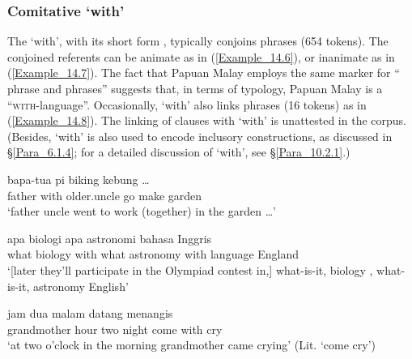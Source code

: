 \subsubsection[Comitative dengang ‘with’]{Comitative  ‘with’}
\label{Para_14.2.1.1}
The    ‘with’, with its short form , typically conjoins  phrases (654 tokens). The conjoined referents can be animate as in (\ref{Example_14.6}), or inanimate as in (\ref{Example_14.7}). The fact that Papuan Malay employs the same marker for “ phrase  and  phrases” suggests that, in terms of  typology, Papuan Malay is a  ``\textsc{with}{}-language''. Occasionally,  ‘with’ also links  phrases (16 tokens) as in (\ref{Example_14.8}). The linking of clauses with   ‘with’ is unattested in the corpus. (Besides,   ‘with’ is also used to encode inclusory  constructions, as discussed in §\ref{Para_6.1.4}; for a detailed discussion of   ‘with’, see §\ref{Para_10.2.1}.)
%


\ea
\label{Example_14.6}
 {} {bapa-tua} {pi} {biking} {kebung} {\ldots}\\ %
father  with  older.uncle  go  make  garden \\
\glt ‘father  uncle went to work (together) in the garden {\ldots}’ \textstyleExampleSource{[080922-001a-CvPh.0629]}
\z

\ea\label{Example_14.7}
\gll {\ldots} {apa} {biologi} {} {apa} {astronomi} {} {bahasa} {Inggris}\\ %
{} what biology with  what  astronomy  with  language  England\\
 ‘[later they’ll participate in the Olympiad contest in,] what-is-it, biology , what-is-it, astronomy  English’ \textstyleExampleSource{[081115-001a-Cv.0111-0113]}
\z

\ea\label{Example_14.8}
 {jam} {dua} {malam} {datang} {} {menangis}\\ %
 grandmother  hour  two  night  come  with  cry\\
\glt ‘at two o’clock in the morning grandmother came crying’ (Lit. ‘come  cry’) \textstyleExampleSource{[081014-008-CvNP.0001]}
\z

